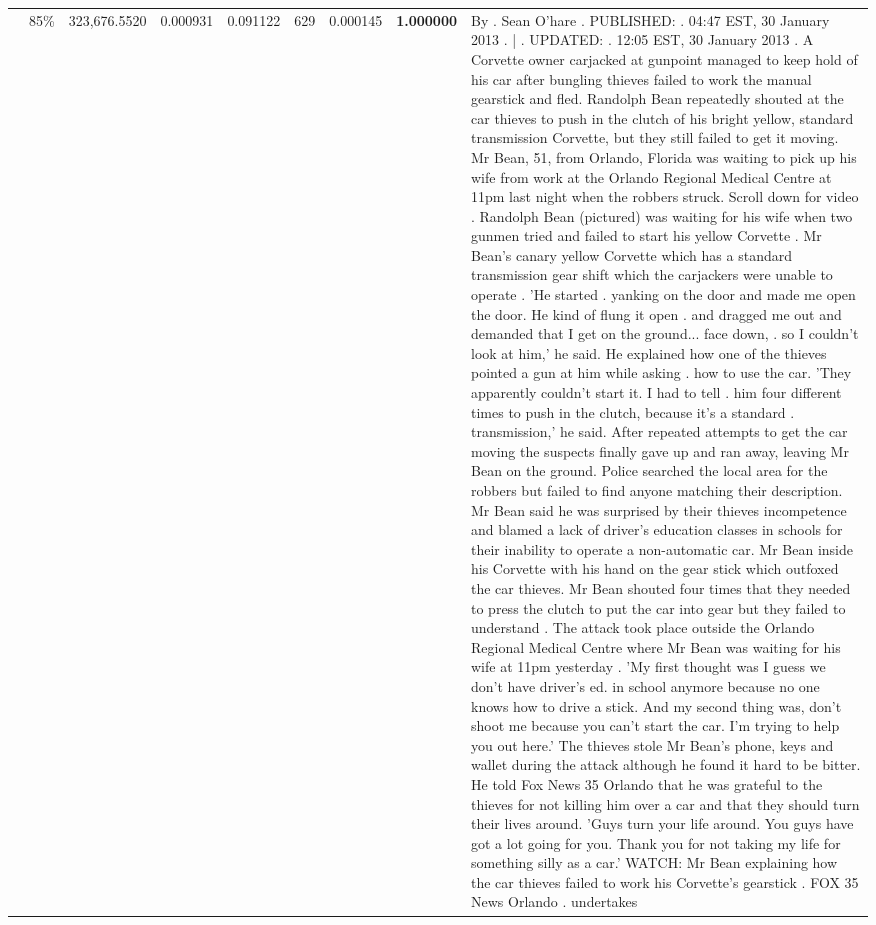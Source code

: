 \begin{table}[H]
\begin{tabular}{llrrrrrrl}
 & 85\% & 323,676.5520 & 0.000931 & 0.091122 & \color{red} 629 & 0.000145 & \bfseries \color{red} 1.000000 & By . Sean O'hare . PUBLISHED: . 04:47 EST, 30 January 2013 . | . UPDATED: . 12:05 EST, 30 January 2013 . A Corvette owner carjacked at gunpoint managed to keep hold of his car after bungling thieves failed to work the manual gearstick and fled. Randolph Bean repeatedly shouted at the car thieves to push in the clutch of his bright yellow, standard transmission Corvette, but they still failed to get it moving. Mr Bean, 51, from Orlando, Florida was waiting to pick up his wife from work at the Orlando Regional Medical Centre at 11pm last night when the robbers struck. Scroll down for video . Randolph Bean (pictured) was waiting for his wife when two gunmen tried and failed to start his yellow Corvette . Mr Bean's canary yellow Corvette which has a standard transmission gear shift which the carjackers were unable to operate . 'He started . yanking on the door and made me open the door. He kind of flung it open . and dragged me out and demanded that I get on the ground... face down, . so I couldn't look at him,' he said. He explained how one of the thieves pointed a gun at him while asking . how to use the car. 'They apparently couldn't start it. I had to tell . him four different times to push in the clutch, because it's a standard . transmission,' he said. After repeated attempts to get the car moving the suspects finally gave up and ran away, leaving Mr Bean on the ground. Police searched the local area for the robbers but failed to find anyone matching their description. Mr Bean said he was surprised by their thieves incompetence and blamed a lack of driver's education classes in schools for their inability to operate a non-automatic car. Mr Bean inside his Corvette with his hand on the gear stick which outfoxed the car thieves. Mr Bean shouted four times that they needed to press the clutch to put the car into gear but they failed to understand . The attack took place outside the Orlando Regional Medical Centre where Mr Bean was waiting for his wife at 11pm yesterday . 'My first thought was I guess we don't have driver's ed. in school anymore because no one knows how to drive a stick. And my second thing was, don't shoot me because you can't start the car. I'm trying to help you out here.' The thieves stole Mr Bean's phone, keys and wallet during the attack although he found it hard to be bitter. He told Fox News 35 Orlando that he was grateful to the thieves for not killing him over a car and that they should turn their lives around. 'Guys turn your life around. You guys have got a lot going for you. Thank you for not taking my life for something silly as a car.' WATCH: Mr Bean explaining how the car thieves failed to work his Corvette's gearstick . FOX 35 News Orlando . undertakes \\

\end{tabular}
\end{table}
